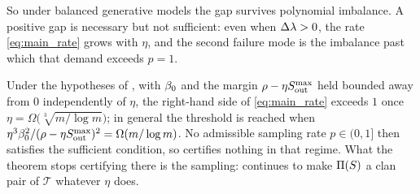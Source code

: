 So under balanced generative models the gap survives polynomial imbalance. A
positive gap is necessary but not sufficient: even when $\Delta\lambda>0$, the rate
\eqref{eq:main_rate} grows with $\eta$, and the second failure mode is the imbalance
past which that demand exceeds $p=1$.

\begin{corollary}\label{cor:infeasible}
Under the hypotheses of , with $\beta_0$ and the margin
$\rho-\eta S_{\mathrm{out}}^{\max}$ held bounded away from $0$ independently of $\eta$, the
right-hand side of \eqref{eq:main_rate} exceeds $1$ once
$\eta=\Omega\!\bigl(\sqrt[3]{m/\log m}\bigr)$; in general the threshold is
reached when $\eta^3\beta_0^2/(\rho-\eta S_{\mathrm{out}}^{\max})^2=\Omega(m/\log m)$. No admissible sampling rate
$p\in(0,1]$ then satisfies the sufficient condition, so 
certifies nothing in that regime. What the theorem stops certifying there is the
sampling:  continues to make $\Pi(S)$ a clan pair of
$\mathcal{T}$ whatever $\eta$ does.
\end{corollary}

